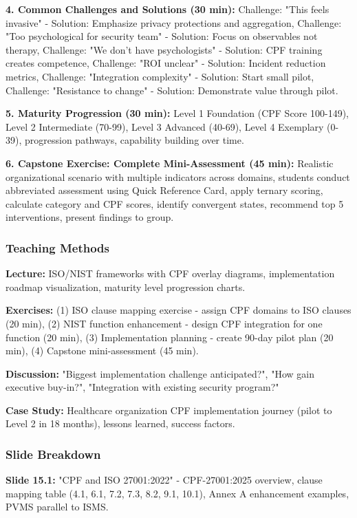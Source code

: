 \documentclass[11pt,a4paper]{article}
\begin{document}
\textbf{4. Common Challenges and Solutions (30 min):} Challenge: "This feels invasive" - Solution: Emphasize privacy protections and aggregation, Challenge: "Too psychological for security team" - Solution: Focus on observables not therapy, Challenge: "We don't have psychologists" - Solution: CPF training creates competence, Challenge: "ROI unclear" - Solution: Incident reduction metrics, Challenge: "Integration complexity" - Solution: Start small pilot, Challenge: "Resistance to change" - Solution: Demonstrate value through pilot.

\textbf{5. Maturity Progression (30 min):} Level 1 Foundation (CPF Score 100-149), Level 2 Intermediate (70-99), Level 3 Advanced (40-69), Level 4 Exemplary (0-39), progression pathways, capability building over time.

\textbf{6. Capstone Exercise: Complete Mini-Assessment (45 min):} Realistic organizational scenario with multiple indicators across domains, students conduct abbreviated assessment using Quick Reference Card, apply ternary scoring, calculate category and CPF scores, identify convergent states, recommend top 5 interventions, present findings to group.

\subsubsection{Teaching Methods}
\textbf{Lecture:} ISO/NIST frameworks with CPF overlay diagrams, implementation roadmap visualization, maturity level progression charts.

\textbf{Exercises:} (1) ISO clause mapping exercise - assign CPF domains to ISO clauses (20 min), (2) NIST function enhancement - design CPF integration for one function (20 min), (3) Implementation planning - create 90-day pilot plan (20 min), (4) Capstone mini-assessment (45 min).

\textbf{Discussion:} "Biggest implementation challenge anticipated?", "How gain executive buy-in?", "Integration with existing security program?"

\textbf{Case Study:} Healthcare organization CPF implementation journey (pilot to Level 2 in 18 months), lessons learned, success factors.

\subsubsection{Slide Breakdown}
\textbf{Slide 15.1:} "CPF and ISO 27001:2022" - CPF-27001:2025 overview, clause mapping table (4.1, 6.1, 7.2, 7.3, 8.2, 9.1, 10.1), Annex A enhancement examples, PVMS parallel to ISMS.
\end{document}
